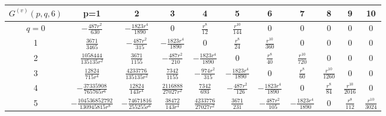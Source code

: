 \documentclass[a4paper,aps,preprint,groupedaddress,showpacs]{revtex4}
\begin{document}
\vspace{40pt}
\begin{tabular}{c|cccccccccc}
\hline\hline
$G^{(v)}(p,q,6)$ & p=1 & 2 & 3 & 4 & 5 & 6 & 7 & 8 & 9 & 10 \\
\hline
$q=0$ & $-\frac{487r^{2}}{630}$ & $-\frac{1823r^{4}}{1890}$ &
0 & $\frac{r^{8}}{12}$ & $\frac{r^{10}}{144}$ & 
0 & 0 & 0 & 0 & 0 \\
1 & $\frac{3671}{3465}$ & $-\frac{487r^{2}}{315}$ &
$-\frac{1823r^{4}}{1890}$ & 0 & $\frac{r^{8}}{24}$ &
$\frac{r^{10}}{360}$ & 0 & 0 & 0 & 0 \\
2 & $\frac{1058444}{135135r^{2}}$ & $\frac{3671}{1155}$ &
$-\frac{487r^{2}}{210}$ & $-\frac{1823r^{4}}{1890}$ &
0 & $\frac{r^{8}}{40}$ & $\frac{r^{10}}{720}$ & 0 & 0 & 0 \\
3 & $\frac{12824}{715r^{4}}$ & $\frac{4233776}{135135r^{2}}$ &
$\frac{7342}{1155}$ & $-\frac{974r^{2}}{315}$ &
$-\frac{1823r^{4}}{1890}$ & 0 & $\frac{r^{8}}{60}$ &
$\frac{r^{10}}{1260}$ & 0 & 0 \\
4 & $-\frac{37335908}{765765r^{6}}$ & $\frac{12824}{143r^{4}}$ &
$\frac{2116888}{27027r^{2}}$ & $\frac{7342}{693}$ &
$-\frac{487r^{2}}{126}$ & $-\frac{1823r^{4}}{1890}$ &
0 & $\frac{r^{8}}{84}$ & $\frac{r^{10}}{2016}$ & 0 \\
5 & $-\frac{104536852792}{130945815r^{8}}$ &
$-\frac{74671816}{255255r^{6}}$ & $\frac{38472}{143r^{4}}$ &
$\frac{4233776}{27027r^{2}}$ & $\frac{3671}{231}$ &
$-\frac{487r^{2}}{105}$ & $-\frac{1823r^{4}}{1890}$ &
0 & $\frac{r^{8}}{112}$ & $\frac{r^{10}}{3024}$ \\
\hline\hline
\end{tabular}
\end{document}
